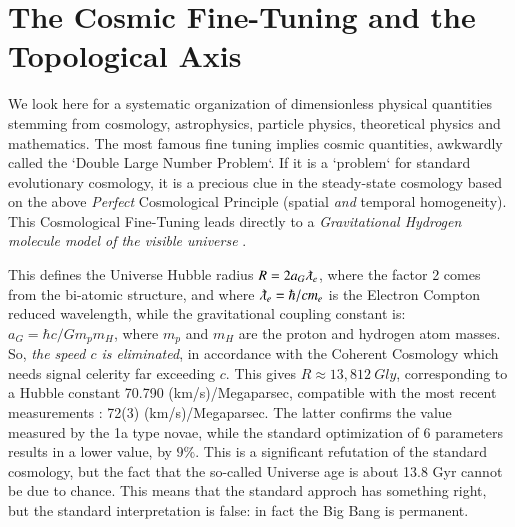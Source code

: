 \documentclass[twoside,draft]{article}
\begin{document}
\begin{sloppypar}
\section {The Cosmic Fine-Tuning and the Topological Axis}

We look here for a systematic organization of dimensionless physical quantities stemming from cosmology, astrophysics, particle   physics, theoretical physics and mathematics. The most famous fine tuning implies cosmic quantities, awkwardly called the `Double Large Number Problem`. If it is a `problem` for standard evolutionary cosmology, it is a precious clue in the steady-state cosmology based on the above \textit{Perfect} Cosmological Principle (spatial \textit{and} temporal homogeneity).
This Cosmological Fine-Tuning leads directly to a \textit{Gravitational Hydrogen molecule model of the visible universe} \cite{Sanchez1}.

This defines the Universe Hubble radius $R = 2a_{G} \lambdabar_{e}$, where the factor 2 comes from the bi-atomic structure, and where $\lambdabar_{e} = \hbar/cm_{e}$ is the Electron Compton reduced wavelength, while the gravitational coupling constant is: $a_{G} = \hbar c/Gm_{p}m_{H}$, where $m_p$ and $m_H$ are the proton and hydrogen atom masses. So, \textit{the speed $c$ is eliminated}, in accordance with the Coherent Cosmology which needs signal celerity far exceeding $c$. This gives $R \approx 13,812~Gly $, corresponding to a Hubble constant 70.790 (km/s)/Megaparsec, compatible with the most recent measurements \cite{Bonvin}: 72(3) (km/s)/Megaparsec. The latter confirms the value measured by the 1a type novae, while the standard optimization of 6 parameters results in a lower value, by $9\%$. This is a significant refutation of the standard cosmology, but the fact that the so-called Universe age is about 13.8 Gyr cannot be due to chance. This means that the standard approch has something right\cite{Sanchez2}, but the standard interpretation is false: in fact the Big Bang is permanent.


\end{sloppypar}
\end{document}
